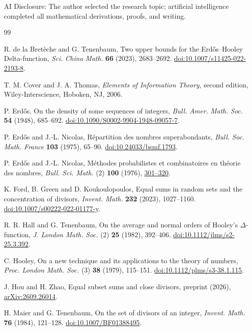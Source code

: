 \documentclass[11pt]{article}
\numberwithin{equation}{section}
\begin{document}
AI Disclosure: The author selected the research topic; artificial intelligence completed all mathematical derivations, proofs, and writing.

\begin{thebibliography}{99}

R. de la Bret\`eche and G. Tenenbaum,
Two upper bounds for the Erd\H{o}s--Hooley Delta-function,
\emph{Sci. China Math.} \textbf{66} (2023), 2683--2692.
\href{https://doi.org/10.1007/s11425-022-2193-8}{doi:10.1007/s11425-022-2193-8}.

T. M. Cover and J. A. Thomas, \emph{Elements of Information Theory},
second edition, Wiley-Interscience, Hoboken, NJ, 2006.

P. Erd\H{o}s, On the density of some sequences of integers,
\emph{Bull. Amer. Math. Soc.} \textbf{54} (1948), 685--692.
\href{https://doi.org/10.1090/S0002-9904-1948-09057-7}{doi:10.1090/S0002-9904-1948-09057-7}.

P. Erd\H{o}s and J.-L. Nicolas, R\'epartition des nombres superabondants,
\emph{Bull. Soc. Math. France} \textbf{103} (1975), 65--90.
\href{https://doi.org/10.24033/bsmf.1793}{doi:10.24033/bsmf.1793}.

P. Erd\H{o}s and J.-L. Nicolas, M\'ethodes probabilistes et combinatoires
en th\'eorie des nombres, \emph{Bull. Sci. Math.} (2) \textbf{100}
(1976), \href{https://www.renyi.hu/~p_erdos/1976-16.pdf}{301--320}.

K. Ford, B. Green and D. Koukoulopoulos,
Equal sums in random sets and the concentration of divisors,
\emph{Invent. Math.} \textbf{232} (2023), 1027--1160.
\href{https://doi.org/10.1007/s00222-022-01177-y}{doi:10.1007/s00222-022-01177-y}.

R. R. Hall and G. Tenenbaum,
On the average and normal orders of Hooley's $\Delta$-function,
\emph{J. London Math. Soc.} (2) \textbf{25} (1982), 392--406.
\href{https://doi.org/10.1112/jlms/s2-25.3.392}{doi:10.1112/jlms/s2-25.3.392}.

C. Hooley, On a new technique and its applications to the theory of numbers,
\emph{Proc. London Math. Soc.} (3) \textbf{38} (1979), 115--151.
\href{https://doi.org/10.1112/plms/s3-38.1.115}{doi:10.1112/plms/s3-38.1.115}.

J. Hou and H. Zhao, Equal subset sums and close divisors,
preprint (2026), \href{https://arxiv.org/abs/2609.26014}{arXiv:2609.26014}.

H. Maier and G. Tenenbaum, On the set of divisors of an integer,
\emph{Invent. Math.} \textbf{76} (1984), 121--128.
\href{https://doi.org/10.1007/BF01388495}{doi:10.1007/BF01388495}.


\end{thebibliography}
\end{document}
